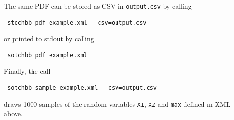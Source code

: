 \documentclass[a4paper, 10pt]{paper}
\newcommand{\code}[1]{\texttt{#1}}
\begin{document}
The same PDF can be stored as CSV in \code{output.csv} by calling
\begin{lstlisting}
 stochbb pdf example.xml --csv=output.csv
\end{lstlisting}
or printed to stdout by calling 
\begin{lstlisting}
 sotchbb pdf example.xml
\end{lstlisting}

Finally, the call
\begin{lstlisting}
 sotchbb sample example.xml --csv=output.csv
\end{lstlisting}
draws 1000 samples of the random variables \code{X1}, \code{X2} and \code{max} defined in XML above.




\end{document}
